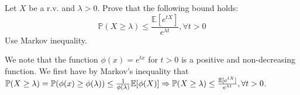 \documentclass[12pt,twoside, letter]{exam}
\theoremstyle{definition}
\newcommand{\ee}{\mathbb{E}}
\newcommand{\pp}{\mathbb{P}}
\begin{document}
 Let $X$ be a r.v. and $\lambda > 0$. Prove that the following bound holds:
  \begin{equation*}
    \pp(X \geq \lambda) \leq \frac{\ee[e^{tX}]}{e^{\lambda t}}, \forall t>0
  \end{equation*}
Use Markov inequality.

  \begin{solution}
    We note that the function $\phi(x) = e^{tx}$ for $t > 0$ is a positive and non-decreasing function. We first have by Markov's inequality that
    $\pp(X \geq \lambda) = \pp(\phi(x) \geq \phi(\lambda)) \\
    \leq \frac{1}{\phi(\lambda)} \ee[\phi(X)] \Rightarrow \pp(X \geq \lambda) \leq \frac{\ee[e^{tX}]}{e^{\lambda t}}, \forall t>0$.
  \end{solution}
\end{document}
